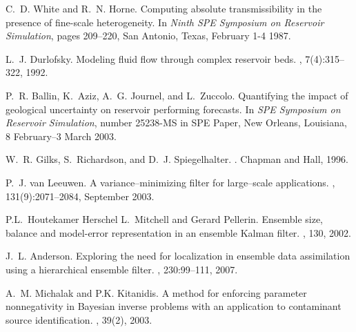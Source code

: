 \begin{thebibliography}{10}
C.~D. White and R.~N. Horne.
\newblock Computing absolute transmissibility in the presence of fine-scale
  heterogeneity.
\newblock In {\em Ninth SPE Symposium on Reservoir Simulation}, pages 209--220,
  San Antonio, Texas, February 1-4 1987.

L.~J. Durlofsky.
\newblock Modeling fluid flow through complex reservoir beds.
, 7(4):315--322, 1992.

P.~R. Ballin, K.~Aziz, A.~G. Journel, and L.~Zuccolo.
\newblock Quantifying the impact of geological uncertainty on reservoir
  performing forecasts.
\newblock In {\em SPE Symposium on Reservoir Simulation}, number 25238-MS in
  SPE Paper, New Orleans, Louisiana, 8 February--3 March 2003.

W.~R. Gilks, S.~Richardson, and D.~J. Spiegelhalter.
.
\newblock Chapman and Hall, 1996.

P.~J. van Leeuwen.
\newblock A variance--minimizing filter for large--scale applications.
, 131(9):2071--2084, September 2003.

P.L.~Houtekamer Herschel L.~Mitchell and Gerard Pellerin.
\newblock Ensemble size, balance and model-error representation in an ensemble
  {K}alman filter.
, 130,
  2002.

J.~L. Anderson.
\newblock Exploring the need for localization in ensemble data assimilation
  using a hierarchical ensemble filter.
, 230:99--111, 2007.

A.~M. Michalak and P.K. Kitanidis.
\newblock A method for enforcing parameter nonnegativity in {B}ayesian inverse
  problems with an application to contaminant source identification.
, 39(2), 2003.

\end{thebibliography}

